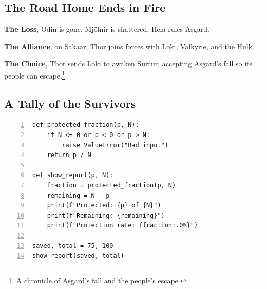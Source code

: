 \subsection{The Road Home Ends in Fire}
\begin{TextSlide}[subtitle={The choice that saves the Asgardians}, note={Thor's choice gives the Asgardians a chance to escape.}]
    \item \textbf{The Loss}, Odin is gone. Mjölnir is shattered. Hela rules Asgard.
    \item \textbf{The Alliance}, on Sakaar, Thor joins forces with Loki, Valkyrie, and the Hulk.
    \item \textbf{The Choice}, Thor sends Loki to awaken Surtur, accepting Asgard's fall so its people can escape.\footnote{A chronicle of Asgard's fall and the people's escape.}
\end{TextSlide}

\subsection{A Tally of the Survivors}
\begin{CodeSlide}[subtitle={An imagined count of those who escaped}, note={The 75 percent figure is an imagined example, not a historical count.}]
        \begin{Verbatim}[fontsize=\footnotesize,numbers=left,numbersep=5pt]
def protected_fraction(p, N):
    if N <= 0 or p < 0 or p > N:
        raise ValueError("Bad input")
    return p / N

def show_report(p, N):
    fraction = protected_fraction(p, N)
    remaining = N - p
    print(f"Protected: {p} of {N}")
    print(f"Remaining: {remaining}")
    print(f"Protection rate: {fraction:.0%}")

saved, total = 75, 100
show_report(saved, total)
      \end{Verbatim}
\end{CodeSlide}

